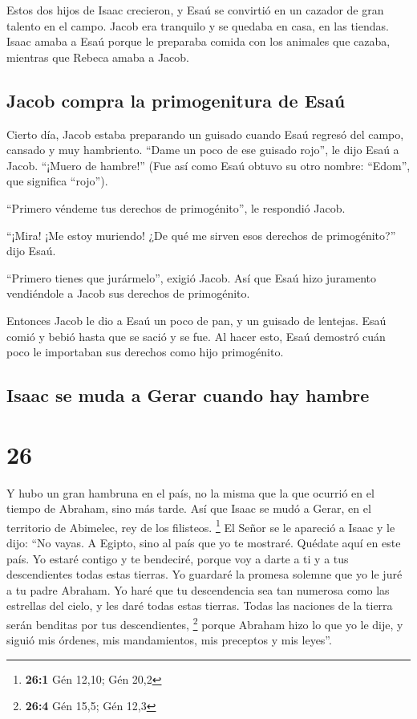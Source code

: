  Estos dos hijos de Isaac crecieron, y Esaú se convirtió
en un cazador de gran talento en el campo. Jacob era tranquilo y se
quedaba en casa, en las tiendas.  Isaac amaba a Esaú
porque le preparaba comida con los animales que cazaba, mientras que
Rebeca amaba a Jacob.

\hypertarget{jacob-compra-la-primogenitura-de-esauxfa}{%
\subsection{Jacob compra la primogenitura de
Esaú}\label{jacob-compra-la-primogenitura-de-esauxfa}}

 Cierto día, Jacob estaba preparando un guisado cuando
Esaú regresó del campo, cansado y muy hambriento.  ``Dame
un poco de ese guisado rojo'', le dijo Esaú a Jacob. ``¡Muero de
hambre!'' (Fue así como Esaú obtuvo su otro nombre: ``Edom'', que
significa ``rojo'').

 ``Primero véndeme tus derechos de primogénito'', le
respondió Jacob.

 ``¡Mira! ¡Me estoy muriendo! ¿De qué me sirven esos
derechos de primogénito?'' dijo Esaú.

 ``Primero tienes que jurármelo'', exigió Jacob. Así que
Esaú hizo juramento vendiéndole a Jacob sus derechos de primogénito.

 Entonces Jacob le dio a Esaú un poco de pan, y un
guisado de lentejas. Esaú comió y bebió hasta que se sació y se fue. Al
hacer esto, Esaú demostró cuán poco le importaban sus derechos como hijo
primogénito.

\hypertarget{isaac-se-muda-a-gerar-cuando-hay-hambre}{%
\subsection{Isaac se muda a Gerar cuando hay
hambre}\label{isaac-se-muda-a-gerar-cuando-hay-hambre}}

\hypertarget{section-25}{%
\section{26}\label{section-25}}

 Y hubo un gran hambruna en el país, no la misma que la
que ocurrió en el tiempo de Abraham, sino más tarde. Así que Isaac se
mudó a Gerar, en el territorio de Abimelec, rey de los filisteos.
\footnote{\textbf{26:1} Gén 12,10; Gén 20,2}  El Señor se
le apareció a Isaac y le dijo: ``No vayas. A Egipto, sino al país que yo
te mostraré.  Quédate aquí en este país. Yo estaré contigo
y te bendeciré, porque voy a darte a ti y a tus descendientes todas
estas tierras. Yo guardaré la promesa solemne que yo le juré a tu padre
Abraham.  Yo haré que tu descendencia sea tan numerosa
como las estrellas del cielo, y les daré todas estas tierras. Todas las
naciones de la tierra serán benditas por tus descendientes, \footnote{\textbf{26:4}
  Gén 15,5; Gén 12,3}  porque Abraham hizo lo que yo le
dije, y siguió mis órdenes, mis mandamientos, mis preceptos y mis
leyes''.

